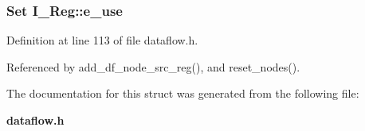 \subsubsection{\setlength{\rightskip}{0pt plus 5cm}\bf{Set} \bf{I\_\-Reg::e\_\-use}}\label{structI__Reg_0c47d1570e4d8e4914f53990b5e4a6dc}




Definition at line 113 of file dataflow.h.

Referenced by add\_\-df\_\-node\_\-src\_\-reg(), and reset\_\-nodes().

The documentation for this struct was generated from the following file:\begin{CompactItemize}
\item 
\bf{dataflow.h}\end{CompactItemize}
